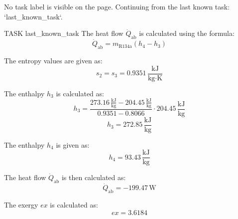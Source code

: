 No task label is visible on the page. Continuing from the last known task: `{last_known_task}`.

TASK {last_known_task}
The heat flow \( \dot{Q}_{\text{ab}} \) is calculated using the formula:
\[
\dot{Q}_{\text{ab}} = m_{\text{R134a}} (h_4 - h_3)
\]

The entropy values are given as:
\[
s_2 = s_3 = 0.9351 \, \frac{\text{kJ}}{\text{kg·K}}
\]

The enthalpy \( h_3 \) is calculated as:
\[
h_3 = \frac{273.16 \, \frac{\text{kJ}}{\text{kg}} - 204.45 \, \frac{\text{kJ}}{\text{kg}}}{0.9351 - 0.8066} \cdot 204.45 \, \frac{\text{kJ}}{\text{kg}}
\]
\[
h_3 = 272.85 \, \frac{\text{kJ}}{\text{kg}}
\]

The enthalpy \( h_4 \) is given as:
\[
h_4 = 93.43 \, \frac{\text{kJ}}{\text{kg}}
\]

The heat flow \( \dot{Q}_{\text{ab}} \) is then calculated as:
\[
\dot{Q}_{\text{ab}} = -199.47 \, \text{W}
\]

The exergy \( ex \) is calculated as:
\[
ex = 3.6184
\]